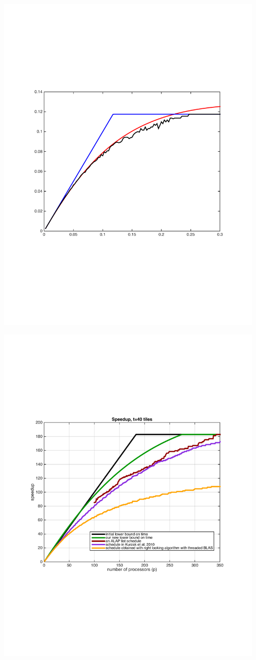 \begin{frame}

\includegraphics[width=.80\textwidth]{matlab_files/CheckWithSomeScheduling_t20.pdf}\\

\end{frame}



\begin{frame}

\includegraphics[width=.80\textwidth]{matlab_files/borneTempsExecByProc_CLEANED_fig1.pdf}\\

\end{frame}



